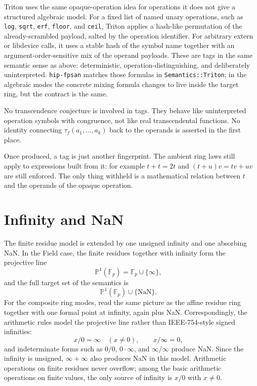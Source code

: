 \documentclass[11pt]{article}
\newcommand{\F}{\mathbb{F}}
\theoremstyle{plain}
\begin{document}
Triton uses the same opaque-operation idea for operations it does not give a
structured algebraic model.  For a fixed list of named unary operations, such as
\texttt{log}, \texttt{sqrt}, \texttt{erf}, \texttt{floor}, and \texttt{ceil},
Triton applies a hash-like permutation of the already-scrambled payload, salted
by the operation identifier.  For arbitrary extern or libdevice calls, it uses a
stable hash of the symbol name together with an argument-order-sensitive mix of
the operand payloads.  These are tags in the same semantic sense as above:
deterministic, operation-distinguishing, and deliberately uninterpreted.
\texttt{hip-fpsan} matches those formulas in \texttt{Semantics::Triton}; in the
algebraic modes the concrete mixing formula changes to live inside the target
ring, but the contract is the same.

No transcendence conjecture is involved in tags.  They behave like
uninterpreted operation symbols with congruence, not like real transcendental
functions.  No identity connecting \(\tau_f(a_1,\ldots,a_k)\) back to the
operands is asserted in the first place.

Once produced, a tag is just another fingerprint.  The ambient ring laws still
apply to expressions built from it: for example \(t+t=2t\) and
\((t+u)v=tv+uv\) are still enforced.  The only thing withheld is a mathematical
relation between \(t\) and the operands of the opaque operation.

\section{Infinity and NaN}

The finite residue model is extended by one unsigned infinity and one absorbing
NaN.  In the Field case, the finite residues together with infinity form the
projective line
\[
  \mathbb{P}^1(\F_p)=\F_p\cup\{\infty\},
\]
and the full target set of the semantics is
\[
  \mathbb{P}^1(\F_p)\cup\{\mathrm{NaN}\}.
\]
For the composite ring modes, read the same picture as the affine residue ring
together with one formal point at infinity, again plus NaN.  Correspondingly,
the arithmetic rules model the projective line rather than IEEE-754-style signed
infinities:
\[
  x/0=\infty\quad (x\ne 0),\qquad
  x/\infty=0,
\]
and indeterminate forms such as \(0/0\), \(0\cdot\infty\), and
\(\infty/\infty\) produce NaN.  Since the infinity is unsigned,
\(\infty+\infty\) also produces NaN in this model.  Arithmetic operations on
finite residues never overflow; among the basic arithmetic operations on finite
values, the only source of infinity is \(x/0\) with \(x\ne 0\).
\end{document}
